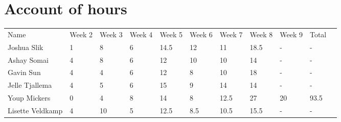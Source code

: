 \chapter{Account of hours}

\begin{table}[h]
\begin{tabular}{| l | l | l | l | l | l | l | l | l | l | l}
 Name & Week 2 & Week 3 & Week 4 & Week 5 & Week 6 & Week 7 & Week 8 & Week 9 & Total & \\
 Joshua Slik & 1 & 8 & 6 & 14.5 & 12 & 11 & 18.5 & - & - & \\
 Ashay Somai & 4 & 8 & 6 & 12 & 10 & 10 & 14 & - & - & \\
 Gavin Sun & 4 & 4 & 6 & 12 & 8 & 10 & 18 & - & - & \\
 Jelle Tjallema & 4 & 5 & 6 & 15 & 9 & 14 & 14 & - & - & \\
 Youp Mickers & 0 & 4 & 8 & 14 & 8 & 12.5 & 27 & 20 & 93.5 & \\
 Lisette Veldkamp & 4 & 10 & 5 & 12.5 & 8.5 & 10.5 & 15.5 & - & - & \\
\end{tabular}
\end{table}